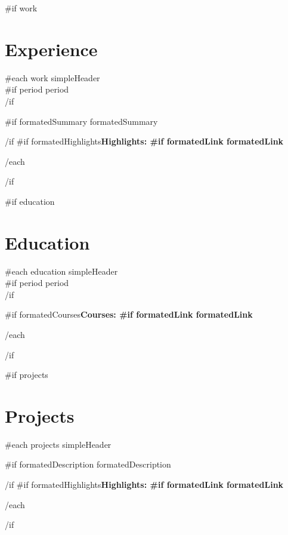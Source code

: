 \documentclass{article}
\begin{document}
{{#if work}}
\section*{Experience} {
  {{#each work}}
    {{ simpleHeader }}\\
    {{#if period}}{{ period }}\\{{/if}}
    \par
    {{#if formatedSummary}}
      {{ formatedSummary }}
      \par
    {{/if}}
    {{#if formatedHighlights}}\bfseries Highlights: 
    {{#if formatedLink}}{{ formatedLink }}
    \par
  {{/each}}
}
{{/if}}

{{#if education}}\section*{Education}{
  {{#each education}}
    {{ simpleHeader }}\\
    {{#if period}}{{ period }}\\{{/if}}
    \par
    {{#if formatedCourses}}\bfseries Courses: 
    {{#if formatedLink}}{{ formatedLink }}
    \par
  {{/each}}
}{{/if}}

{{#if projects}}\section*{Projects}{
  {{#each projects}}
    {{ simpleHeader }}\par
    {{#if formatedDescription}}
      {{ formatedDescription }}
      \par
    {{/if}}
    {{#if formatedHighlights}}\bfseries Highlights: 
    {{#if formatedLink}}{{ formatedLink }}
    \par
  {{/each}}
}{{/if}}
\end{document}
